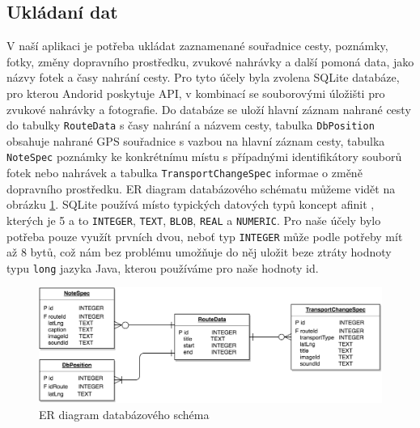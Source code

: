 \documentclass{article}
\begin{document}
\subsection{Ukládaní dat}
V naší aplikaci je potřeba ukládat zaznamenané souřadnice cesty, poznámky, fotky, změny dopravního
prostředku, zvukové nahrávky a další pomoná data, jako názvy fotek a časy nahrání cesty. Pro tyto
účely byla zvolena SQLite databáze, pro kterou Andorid poskytuje API, v kombinací se souborovými úložišti
pro zvukové nahrávky a fotografie. Do databáze se uloží hlavní záznam nahrané cesty do tabulky \texttt{RouteData}
s časy nahrání a názvem cesty, tabulka \texttt{DbPosition} obsahuje nahrané GPS souřadnice s vazbou
na hlavní záznam cesty, tabulka \texttt{NoteSpec} poznámky ke konkrétnímu místu s případnými identifikátory
souborů fotek nebo nahrávek a tabulka \texttt{TransportChangeSpec} informae o změně dopravního prostředku.
ER diagram databázového schématu můžeme vidět na obrázku \ref{fig:db_er}. SQLite používá místo typických datových typů koncept afinit
\cite{sqlitetypes}, kterých je 5 a to \texttt{INTEGER}, \texttt{TEXT}, \texttt{BLOB}, \texttt{REAL} a \texttt{NUMERIC}.
Pro naše účely bylo potřeba pouze využít prvních dvou, neboť typ \texttt{INTEGER} může podle potřeby
mít až 8 bytů\cite{sqlitetypes}, což nám bez problému umožňuje do něj uložit beze ztráty hodnoty typu
\texttt{long} jazyka Java, kterou používáme pro naše hodnoty id.


\begin{figure}[H]
        \centering
                \includegraphics[scale=0.2]{img/db_er.png}
        \caption{ER diagram databázového schéma}
        \label{fig:db_er}
\end{figure}
\end{document}

